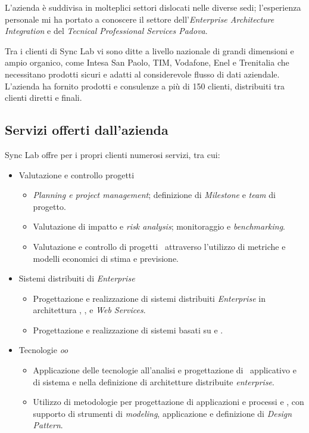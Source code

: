 L'azienda è suddivisa in molteplici settori dislocati nelle diverse sedi; l'esperienza personale mi ha portato a conoscere il settore dell'\textit{Enterprise Architecture Integration} e del \textit{Tecnical Professional Services Padova}.

Tra i clienti di Sync Lab vi sono ditte a livello nazionale di grandi dimensioni e ampio organico, come Intesa San Paolo, TIM, Vodafone, Enel e Trenitalia che necessitano prodotti sicuri e adatti al considerevole flusso di dati aziendale.
L'azienda ha fornito prodotti e consulenze a più di 150 clienti, distribuiti tra clienti diretti e finali.


\subsection{Servizi offerti dall'azienda}

Sync Lab offre per i propri clienti numerosi servizi, tra cui:
\begin{itemize}
  \item Valutazione e controllo progetti
    \begin{itemize}
      \item \textit{Planning e project management}; definizione di \textit{Milestone} e \textit{team} di progetto.
      \item Valutazione di impatto e \textit{risk analysis}; monitoraggio e \textit{benchmarking}.
      \item Valutazione e controllo di progetti \software\ attraverso l’utilizzo di metriche e modelli economici di stima e previsione.
    \end{itemize}
    \item Sistemi distribuiti di \textit{Enterprise}
      \begin{itemize}
        \item Progettazione e realizzazione di sistemi distribuiti \textit{Enterprise} in architettura , ,  e \textit{Web Services}.
        \item Progettazione e realizzazione di sistemi basati su  e .
      \end{itemize}
    \item Tecnologie \textit{\acrlong{oo}}
    \begin{itemize}
      \item Applicazione delle tecnologie  all’analisi e progettazione di \software\ applicativo e di sistema e nella definizione di architetture distribuite \textit{enterprise}.
      \item Utilizzo di metodologie  per progettazione di applicazioni e processi e , con supporto di strumenti di \textit{modeling}, applicazione e definizione di \textit{Design Pattern}.
    \end{itemize}
\end{itemize}




